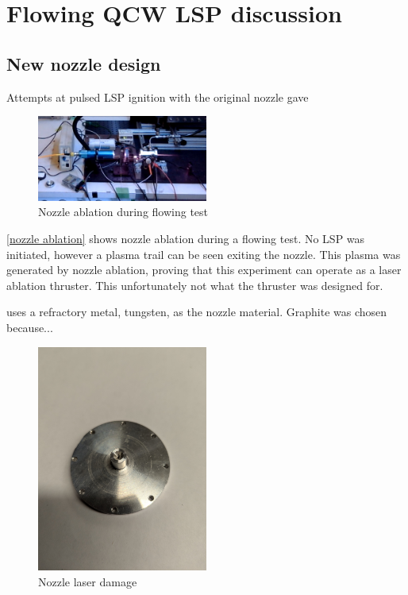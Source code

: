 \section{Flowing QCW LSP discussion}

    \subsection{New nozzle design}

    Attempts at pulsed LSP ignition with the original nozzle gave 

    \begin{figure}[!ht]
        \centering
        \includegraphics[width=0.5\textwidth]{assets/5 discussion/Nozzle ablation.png}
        \caption{Nozzle ablation during flowing test}
        \label{nozzle ablation}
    \end{figure}

    \autoref{nozzle ablation} shows nozzle ablation during a flowing test. No LSP was initiated, however a plasma trail can be seen exiting the nozzle. This plasma was generated by nozzle ablation, proving that this experiment can operate as a laser ablation thruster. This unfortunately not what the thruster was designed for. 

    \textcite{toyodaThrustPerformanceCW2002} uses a refractory metal, tungsten, as the nozzle material. Graphite was chosen because... 

    \begin{figure}[!ht]
        \centering
        \includegraphics[width=0.5\textwidth]{assets/4 experiments/Nozzle damage.jpg}
        \caption{Nozzle laser damage}
    \end{figure}


